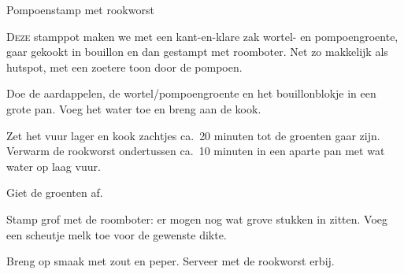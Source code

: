 \begin{recipe}{Pompoenstamp met rookworst}


\lettrine{D}{eze} stamppot maken we met een kant-en-klare zak wortel- en
pompoengroente, gaar gekookt in bouillon en dan gestampt met roomboter.
Net zo makkelijk als hutspot, met een zoetere toon door de pompoen.

\begin{ingredients}
\end{ingredients}

\begin{steps}
  \item Doe de aardappelen, de wortel/pompoengroente en het bouillonblokje
        in een grote pan. Voeg het water toe en breng aan de kook.
  \item Zet het vuur lager en kook zachtjes ca.\ 20 minuten tot de groenten
        gaar zijn. Verwarm de rookworst ondertussen ca.\ 10 minuten in een
        aparte pan met wat water op laag vuur.
  \item Giet de groenten af.
  \item Stamp grof met de roomboter: er mogen nog wat grove stukken in
        zitten. Voeg een scheutje melk toe voor de gewenste dikte.
  \item Breng op smaak met zout en peper. Serveer met de rookworst erbij.
\end{steps}
\end{recipe}
